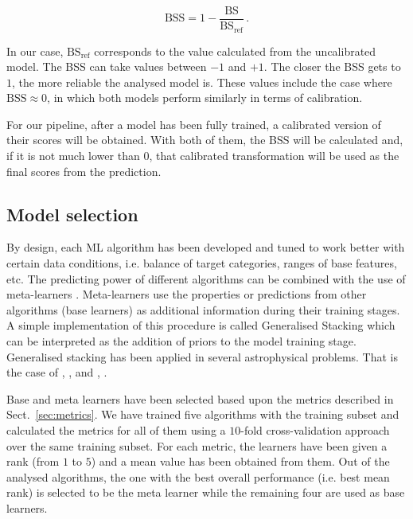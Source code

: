 \documentclass{aa}
\begin{document}
\begin{equation}\label{eq:brier_skill_score}
\mathrm{BSS} = 1 - \frac{\mathrm{BS}}{\mathrm{BS}_{\mathrm{ref}}}\,.
\end{equation}

In our case, $\mathrm{BS}_{\mathrm{ref}}$ corresponds to the value calculated from the uncalibrated model. The BSS can take values between $-1$ and $+1$. The closer the BSS gets to $1$, the more reliable the analysed model is. These values include the case where ${\mathrm{BSS} {\approx} 0}$, in which both models perform similarly in terms of calibration.

For our pipeline, after a model has been fully trained, a calibrated version of their scores will be obtained. With both of them, the BSS will be calculated and, if it is not much lower than $0$, that calibrated transformation will be used as the final scores from the prediction.

\subsection{Model selection}\label{sec:model_selection}

By design, each ML algorithm has been developed and tuned to work better with certain data conditions, i.e. balance of target categories, ranges of base features, etc. 
The predicting power of different algorithms can be combined with the use of meta-learners \citep{Vanschoren2019}. Meta-learners use the properties or predictions from other algorithms (base learners) as additional information during their training stages. A simple implementation of this procedure is called Generalised Stacking \citep{WOLPERT1992241} which can be interpreted
as the addition of priors to the model training stage. Generalised stacking has been applied in several astrophysical problems. That is the case of \citet{2016MNRAS.460.3152Z}, \citet{2022A&A...666A..87C}, and \citet{2023MNRAS.520.3529E}, \citet{2023A&A...671A..99E}.

Base and meta learners have been selected based upon the metrics described in Sect.~\ref{sec:metrics}. We have trained five algorithms with the training subset and calculated the metrics for all of them using a $10$-fold cross-validation approach \citep[e.g.][]{https://doi.org/10.1111/j.2517-6161.1974.tb00994.x, doi:10.1080/00401706.1974.10489157} over the same training subset. For each metric, the learners have been given a rank (from $1$ to $5$) and a mean value has been obtained from them. Out of the analysed algorithms, the one with the best overall performance (i.e. best mean rank) is selected to be the meta learner while the remaining four are used as base learners.
\end{document}
